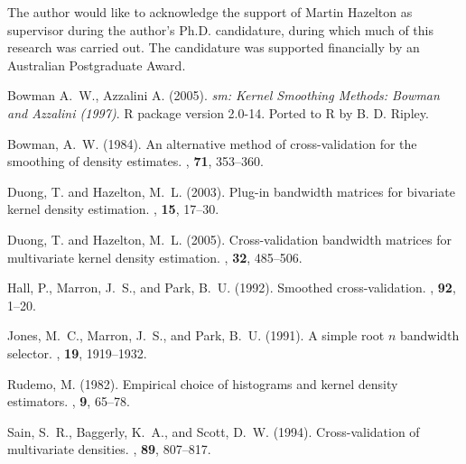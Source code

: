 \documentclass[a4paper,11pt]{article}
\begin{document}
The author would like to acknowledge the support of Martin Hazelton as
supervisor during the author's Ph.D. candidature, during which much of this
research was carried out. The candidature was supported financially by an Australian
Postgraduate Award. 




%

\begin{thebibliography}{xx}

Bowman A.~W., Azzalini A. (2005).
\newblock \emph{sm: Kernel Smoothing Methods: Bowman and Azzalini (1997)}.
\newblock R package version 2.0-14. Ported to R by B. D. Ripley.

Bowman, A.~W. (1984).
\newblock An alternative method of cross-validation for the smoothing of
  density estimates.
, \textbf{71}, 353--360.

Duong, T. and Hazelton, M.~L. (2003).
\newblock Plug-in bandwidth matrices for bivariate kernel density estimation.
, \textbf{15}, 17--30.

Duong, T. and Hazelton, M.~L. (2005).
\newblock Cross-validation bandwidth matrices for multivariate kernel density
  estimation.
, \textbf{32}, 485--506.

Hall, P., Marron, J.~S., and Park, B.~U. (1992).
\newblock Smoothed cross-validation.
, \textbf{92}, 1--20.

Jones, M.~C., Marron, J.~S., and Park, B.~U. (1991).
\newblock A simple root $n$ bandwidth selector.
, \textbf{19}, 1919--1932.

Rudemo, M. (1982).
\newblock Empirical choice of histograms and kernel density estimators.
,
  \textbf{9}, 65--78.

Sain, S.~R., Baggerly, K.~A., and Scott, D.~W. (1994).
\newblock Cross-validation of multivariate densities.
, \textbf{89}, 807--817.


\end{thebibliography}
\end{document}
